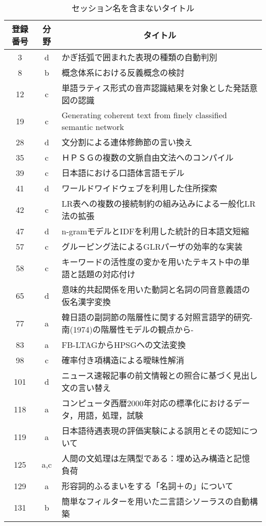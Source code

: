 \begin{table*}
\begin{center}
\caption[表]{\label{nashi}セッション名を含まないタイトル}
\scriptsize
\begin{tabular}{|c|c|l|}\hline 
登録番号 & 分野 &  \multicolumn{1}{|c|}{タイトル}\\\hline
  3 & d & かぎ括弧で囲まれた表現の種類の自動判別\\\hline
  8 & b & 概念体系における反義概念の検討\\\hline
 12 & c & 単語ラティス形式の音声認識結果を対象とした発話意図の認識\\\hline
 19 & c & Generating coherent text from finely classified semantic network\\\hline
 28 & d & 文分割による連体修飾節の言い換え\\\hline
 35 & c & ＨＰＳＧの複数の文脈自由文法へのコンパイル\\\hline
 39 & c & 日本語における口語体言語モデル\\\hline
 41 & d & ワールドワイドウェブを利用した住所探索\\\hline
 42 & c & LR表への複数の接続制約の組み込みによる一般化LR法の拡張\\\hline
 47 & d & n-gramモデルとIDFを利用した統計的日本語文短縮\\\hline
 57 & c & グルーピング法によるGLRパーザの効率的な実装\\\hline
 58 & c & キーワードの活性度の変かを用いたテキスト中の単語と話題の対応付け\\\hline
 65 & d & 意味的共起関係を用いた動詞と名詞の同音意義語の仮名漢字変換\\\hline
 77 & a & 韓日語の副詞節の階層性に関する対照言語学的研究-南(1974)の階層性モデルの観点から-\\\hline
 83 & a & FB-LTAGからHPSGへの文法変換 \\\hline
 98 & c & 確率付き項構造による曖昧性解消\\\hline
101 & d & ニュース速報記事の前文情報との照合に基づく見出し文の言い替え\\\hline
118 & a & コンピュータ西暦2000年対応の標準化におけるデータ，用語，処理，試験\\\hline
119 & a & 日本語待遇表現の評価実験による誤用とその認知について\\\hline
125 & a,c & 人間の文処理は左隅型である：埋め込み構造と記憶負荷\\\hline
129 & a & 形容詞的ふるまいをする「名詞＋の」について \\\hline
131 & b & 簡単なフィルターを用いた二言語シソーラスの自動構築\\\hline 
\end{tabular}
\end{center}
\end{table*}

